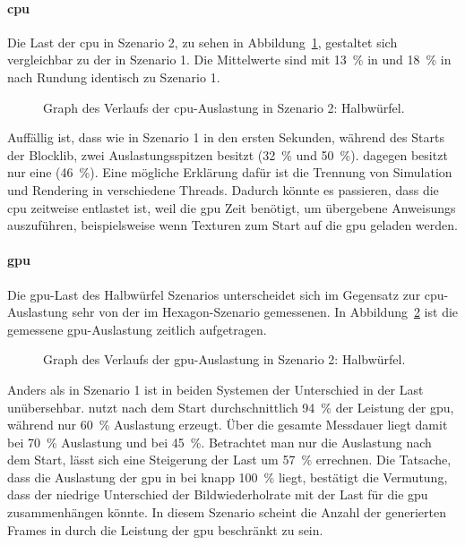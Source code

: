 \paragraph{\ac{cpu}} Die Last der \ac{cpu} in Szenario 2, zu sehen in Abbildung~\ref{fig:seed-0-cube-cpu}, gestaltet sich vergleichbar zu der in Szenario 1. Die Mittelwerte sind mit \SI{13}{\percent} in \sysA{} und \SI{18}{\percent} in \sysB{} nach Rundung identisch zu Szenario 1.
\begin{figure}[!htb]
	\caption[Graph des Verlaufs der -Auslastung in Szenario 2: Halbwürfel.]{Graph des Verlaufs der \ac{cpu}-Auslastung in Szenario 2: Halbwürfel.}\label{fig:seed-0-cube-cpu}
\end{figure}
Auffällig ist, dass \sysB{} wie in Szenario 1 in den ersten Sekunden, während des Starts der Blocklib, zwei Auslastungsspitzen besitzt (\SI{32}{\percent} und \SI{50}{\percent}). \sysA{} dagegen besitzt nur eine (\SI{46}{\percent}). Eine mögliche Erklärung dafür ist die Trennung von Simulation und Rendering in verschiedene Threads. Dadurch könnte es passieren, dass die \ac{cpu} zeitweise  entlastet ist, weil die \ac{gpu} Zeit benötigt, um übergebene \glspl{Anweisung} auszuführen, beispielsweise wenn Texturen zum Start auf die \ac{gpu} geladen werden.

\paragraph{\ac{gpu}} Die \ac{gpu}-Last des Halbwürfel Szenarios unterscheidet sich im Gegensatz zur \ac{cpu}-Auslastung sehr von der im Hexagon-Szenario gemessenen. In Abbildung~\ref{fig:seed-0-cube-gpu} ist die gemessene \ac{gpu}-Auslastung zeitlich aufgetragen. 
\begin{figure}[!htb]
	\caption[Graph des Verlaufs der -Auslastung in Szenario 2: Halbwürfel.]{Graph des Verlaufs der \ac{gpu}-Auslastung in Szenario 2: Halbwürfel.}\label{fig:seed-0-cube-gpu}
\end{figure}

Anders als in Szenario 1 ist in beiden Systemen der Unterschied in der Last unübersehbar. \sysB{} nutzt nach dem Start durchschnittlich \SI{94}{\percent} der Leistung der \ac{gpu}, während \sysA{} nur \SI{60}{\percent} Auslastung erzeugt. Über die gesamte Messdauer liegt \sysB{} damit bei \SI{70}{\percent} Auslastung und \sysA{} bei \SI{45}{\percent}. Betrachtet man nur die Auslastung nach dem Start, lässt sich eine Steigerung der Last um \SI{57}{\percent} errechnen. Die Tatsache, dass die Auslastung der \ac{gpu} in \sysB{} bei knapp \SI{100}{\percent} liegt, bestätigt die Vermutung, dass der niedrige Unterschied der Bildwiederholrate mit der Last für die \ac{gpu} zusammenhängen könnte. In diesem Szenario scheint die Anzahl der generierten Frames in \sysB{} durch die Leistung der \ac{gpu} beschränkt zu sein. 



